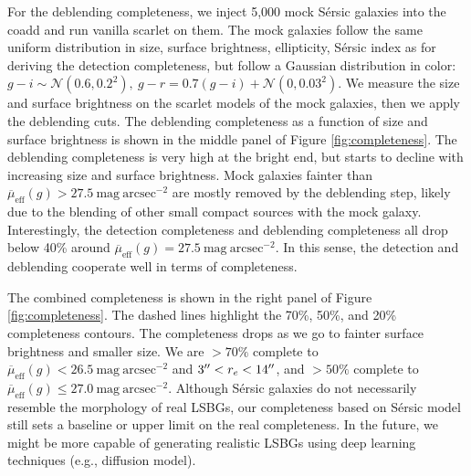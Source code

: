 \documentclass[twocolumn,astrosymb,twocolappendix]{aastex631}
\newcommand{\sbunit}{\mathrm{mag\ arcsec}^{-2}}
\newcommand{\sbeff}{\overline{\mu}_{\mathrm{eff}}(g)}
\newcommand{\sersic}{S\'ersic}
\begin{document}
\begin{CJK*}{UTF8}{gbsn}
For the deblending completeness, we inject 5,000 mock \sersic{} galaxies into the coadd and run vanilla scarlet on them. The mock galaxies follow the same uniform distribution in size, surface brightness, ellipticity, \sersic{} index as for deriving the detection completeness, but follow a Gaussian distribution in color: $g-i \sim \mathcal{N}(0.6, 0.2^2),\ g-r = 0.7 (g-i) + \mathcal{N}(0, 0.03^2)$. We measure the size and surface brightness on the scarlet models of the mock galaxies, then we apply the deblending cuts. The deblending completeness as a function of size and surface brightness is shown in the middle panel of Figure \ref{fig:completeness}. The deblending completeness is very high at the bright end, but starts to decline with increasing size and surface brightness. Mock galaxies fainter than $\sbeff > 27.5\ \sbunit$ are mostly removed by the deblending step, likely due to the blending of other small compact sources with the mock galaxy. Interestingly, the detection completeness and deblending completeness all drop below 40\% around $\sbeff=27.5\ \sbunit$. In this sense, the detection and deblending cooperate well in terms of completeness. 

The combined completeness is shown in the right panel of Figure \ref{fig:completeness}. The dashed lines highlight the 70\%, 50\%, and 20\% completeness contours. The completeness drops as we go to fainter surface brightness and smaller size. We are $>70\%$ complete to $\sbeff < 26.5\ \sbunit$ and $3\mbox{$^{\prime\prime}$} < r_e < 14\mbox{$^{\prime\prime}$}$, and $>50\%$ complete to $\sbeff \leqslant 27.0\ \sbunit$. Although \sersic{} galaxies do not necessarily resemble the morphology of real LSBGs, our completeness based on \sersic{} model still sets a baseline or upper limit on the real completeness. In the future, we might be more capable of generating realistic LSBGs using deep learning techniques (e.g., diffusion model). 



\end{CJK*}
\end{document}
